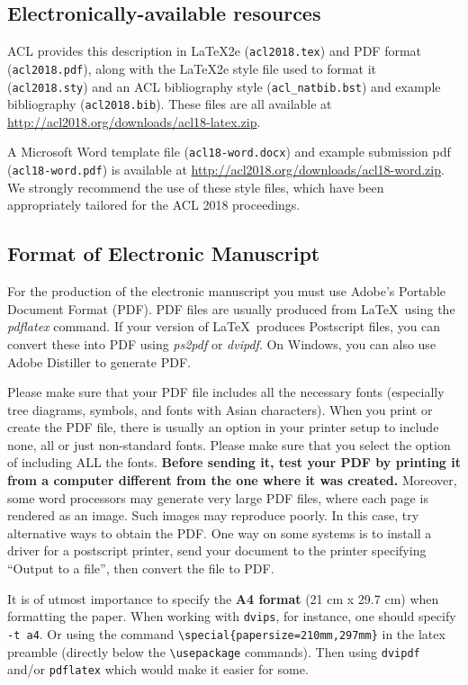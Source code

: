 \documentclass[11pt,a4paper]{article}
\begin{document}
\subsection{Electronically-available resources}

ACL provides this description in \LaTeX2e{} ({\small\tt acl2018.tex}) and PDF
format ({\small\tt acl2018.pdf}), along with the \LaTeX2e{} style file used to
format it ({\small\tt acl2018.sty}) and an ACL bibliography style ({\small\tt acl\_natbib.bst})
and example bibliography ({\small\tt acl2018.bib}).
These files are all available at
\url{http://acl2018.org/downloads/acl18-latex.zip}.

A Microsoft Word template file ({\small\tt acl18-word.docx}) and example submission pdf ({\small\tt acl18-word.pdf})
is available at
\url{http://acl2018.org/downloads/acl18-word.zip}.
We strongly recommend the use of these style files, which have been
appropriately tailored for the ACL 2018 proceedings.

\subsection{Format of Electronic Manuscript}
\label{sect:pdf}

For the production of the electronic manuscript you must use Adobe's
Portable Document Format (PDF). PDF files are usually produced from
\LaTeX\ using the \textit{pdflatex} command. If your version of
\LaTeX\ produces Postscript files, you can convert these into PDF
using \textit{ps2pdf} or \textit{dvipdf}. On Windows, you can also use
Adobe Distiller to generate PDF.

Please make sure that your PDF file includes all the necessary fonts
(especially tree diagrams, symbols, and fonts with Asian
characters). When you print or create the PDF file, there is usually
an option in your printer setup to include none, all or just
non-standard fonts.  Please make sure that you select the option of
including ALL the fonts. \textbf{Before sending it, test your PDF by
  printing it from a computer different from the one where it was
  created.} Moreover, some word processors may generate very large PDF
files, where each page is rendered as an image. Such images may
reproduce poorly. In this case, try alternative ways to obtain the
PDF. One way on some systems is to install a driver for a postscript
printer, send your document to the printer specifying ``Output to a
file'', then convert the file to PDF.

It is of utmost importance to specify the \textbf{A4 format} (21 cm
x 29.7 cm) when formatting the paper. When working with
{\tt dvips}, for instance, one should specify {\tt -t a4}.
Or using the command \verb|\special{papersize=210mm,297mm}| in the latex
preamble (directly below the \verb|\usepackage| commands). Then using
{\tt dvipdf} and/or {\tt pdflatex} which would make it easier for some.
\end{document}
